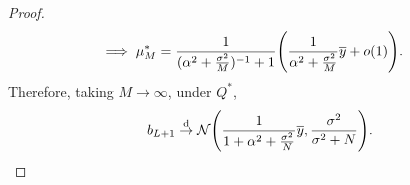 \documentclass[twoside]{article}
\newcommand{\vz}{\mathbf{z}}
\newcommand{\vmu}{\bm{\upmu}}
\newcommand{\vnu}{\bm{\upnu}}
\newcommand{\E}{\mathbb{E}}
\newcommand{\T}{\text{\textsf{T}}}
\newcommand{\oto}[1]{\overset{#1}{\to}}
\newcommand{\distto}{\oto{\text{d}}}
\newcommand{\opspace}{}
\newcommand{\diag}{\operatorname{diag}\opspace}
\newcommand{\Normal}{\mathcal{N}}
\DeclarePairedDelimiter\parens{(}{)}             %
\DeclarePairedDelimiter\sbrac{[}{]}              %
\DeclarePairedDelimiter\lra{\langle}{\rangle}    %
\theoremstyle{theoremstyle}
\begin{document}
\begin{proof}
\begin{align}
        \implies
        \mu_M^* &= \frac{1}{(\alpha^2 + \frac{\sigma^2}{M})^{-1} + 1}\parens*{
            \frac{1}{\alpha^2 + \frac{\sigma^2}{M}} \overline{y}
            + o(1)
        }.
    \end{align}
    Therefore, taking $M \to \infty$, under $Q^*$,
    \begin{equation}
        b_{L+1} \distto \Normal\parens*{\frac{1}{1 + \alpha^2 + \frac{\sigma^2}{N}} \overline{y}, \frac{\sigma^2}{\sigma^2 + N}}.
    \end{equation}
    

\end{proof}
\end{document}

